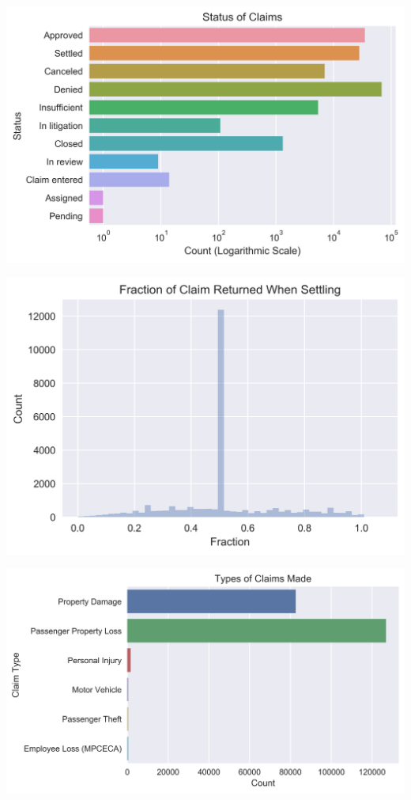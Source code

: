 \documentclass{beamer}
\begin{document}
\begin{frame}
	\includegraphics[keepaspectratio, width = \textwidth, height = \textheight]{../plots/log_status}
\end{frame}

\begin{frame}
	\includegraphics[keepaspectratio, width = \textwidth, height = \textheight]{../plots/settled}
\end{frame}

\begin{frame}
	\includegraphics[keepaspectratio, width = \textwidth, height = \textheight]{../plots/type}
\end{frame}
\end{document}
